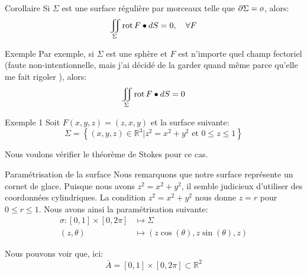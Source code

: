 \documentclass[a4paper]{article}
\begin{document}
\begin{parag}{Corollaire}
    Si $\Sigma$ est une surface régulière par morceaux telle que $\partial \Sigma = \o$, alors: 
    \[\iint_{\Sigma} \operatorname{rot} F \bullet dS = 0, \quad \forall F\]
    
    \begin{subparag}{Exemple}
        Par exemple, si $\Sigma$ est une sphère et $F$ est n'importe quel champ fectoriel (faute non-intentionnelle, mais j'ai décidé de la garder quand même parce qu'elle me fait rigoler \smiley), alors: 
        \[\iint_{\Sigma} \operatorname{rot} F \bullet dS = 0\]
    \end{subparag}
\end{parag}

\begin{parag}{Exemple 1}
    Soit $F\left(x, y, z\right) = \left(z, x, y\right)$ et la surface suivante: 
    \[\Sigma = \left\{\left(x, y, z\right) \in \mathbb{R}^3 | z^2 = x^2 + y^2 \text{ et } 0 \leq z \leq 1\right\}\]

    Nous voulons vérifier le théorème de Stokes pour ce cas.
    
    \begin{subparag}{Paramétrisation de la surface}
        Nous remarquons que notre surface représente un cornet de glace. Puisque nous avons $z^2 = x^2 + y^2$, il semble judicieux d'utiliser des coordonnées cylindriques. La condition $z^2 = x^2 + y^2$ nous donne $z = r$ pour $0 \leq r \leq 1$. Nous avons ainsi la paramétrisation suivante:
        \[\begin{split}
        \sigma: \left[0, 1\right]\times \left[0, 2\pi\right] &\longmapsto \Sigma \\
        \left(z, \theta\right) &\longmapsto \left(z\cos\left(\theta\right), z\sin\left(\theta\right), z\right)
        \end{split}\]
        
        Nous pouvons voir que, ici: 
        \[\bar{A} = \left[0, 1\right] \times \left[0, 2\pi\right] \subset \mathbb{R}^2\]
    \end{subparag}


\end{parag}
\end{document}
